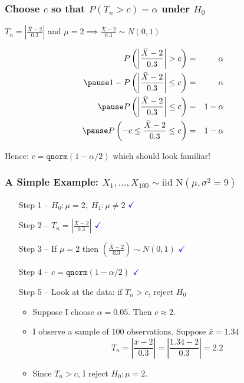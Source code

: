 \begin{frame}
  \frametitle{Choose $c$ so that $P(T_n >c) = \alpha$ under $H_0$}
  $T_n = \displaystyle \left|\frac{\bar{X}-2}{0.3}\right|$ and $\mu=2 \implies \displaystyle \frac{\bar{X}-2}{0.3} \sim N(0,1)$ \pause

  \begin{eqnarray*}
    P\left( \left|\frac{\bar{X}-2}{0.3}\right| > c \right) &=& \alpha\\ \pause
    1 - P\left( \left|\frac{\bar{X}-2}{0.3}\right| \leq c \right) &=& \alpha\\ \pause
    P\left( \left|\frac{\bar{X}-2}{0.3}\right| \leq c \right) &=& 1 - \alpha\\ \pause
    P\left(-c \leq \frac{\bar{X}-2}{0.3} \leq c \right) &=& 1 - \alpha
  \end{eqnarray*}

  \alert{Hence: $c = \texttt{qnorm}(1 - \alpha/2)$ which should look familiar!}
\end{frame}
\begin{frame}
  \frametitle{A Simple Example: $X_1, \dots, X_{100}\sim \mbox{iid N}(\mu, \sigma^2 = 9)$}
  \begin{enumerate}
    \item[Step 1] -- $H_0\colon \mu = 2, \; H_1\colon \mu \neq 2$ $\textcolor{blue}{\checkmark}$
    \item[Step 2] -- $T_n = \displaystyle \left|\frac{\bar{X} - 2}{0.3} \right|$ $\textcolor{blue}{\checkmark}$
    \item[Step 3] -- If $\mu = 2$ then $\displaystyle \left(\frac{\bar{X} - 2}{0.3}\right) \sim N(0,1)$ $\textcolor{blue}{\checkmark}$
    \item[Step 4] -- $c = \texttt{qnorm}(1 - \alpha /2)$ $ \textcolor{blue}{\checkmark}$
    \item[Step 5] -- \alert{Look at the data: if $T_n >c$, reject $H_0$}\pause
      \begin{itemize}
        \item Suppose I choose $\alpha = 0.05$. Then $c \approx 2$.\pause
        \item I observe a sample of 100 observations. Suppose $\bar{x} = 1.34$
          \[T_n = \displaystyle\left|\frac{\bar{x} - 2}{0.3}\right| =\left|\frac{1.34 - 2}{0.3}\right| = 2.2  \]\pause
          \vspace{-2em}
        \item Since $T_n > c$, I reject $H_0\colon \mu=2$.
      \end{itemize}
  \end{enumerate}
\end{frame}

